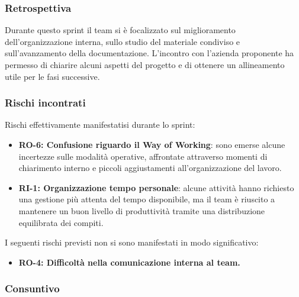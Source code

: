 \documentclass[a4paper,12pt]{article}
\newlength{\namecol}
\begin{document}
{        \subsubsection{Retrospettiva}{
            Durante questo sprint il team si è focalizzato sul miglioramento dell'organizzazione interna, sullo studio del materiale condiviso e sull'avanzamento della documentazione. L'incontro con l'azienda proponente ha permesso di chiarire alcuni aspetti del progetto e di ottenere un allineamento utile per le fasi successive.
        }

        \subsubsection{Rischi incontrati}{
            Rischi effettivamente manifestatisi durante lo sprint:
            \begin{itemize}
                \item \textbf{RO-6: Confusione riguardo il Way of Working}: sono emerse alcune incertezze sulle modalità operative, affrontate attraverso momenti di chiarimento interno e piccoli aggiustamenti all'organizzazione del lavoro.
                \item \textbf{RI-1: Organizzazione tempo personale}: alcune attività hanno richiesto una gestione più attenta del tempo disponibile, ma il team è riuscito a mantenere un buon livello di produttività tramite una distribuzione equilibrata dei compiti.
            \end{itemize}

            I seguenti rischi previsti non si sono manifestati in modo significativo:
            \begin{itemize}
                \item \textbf{RO-4: Difficoltà nella comunicazione interna al team.}
            \end{itemize}
        }

        \subsubsection{Consuntivo}{
            \begin{table}[H]
                \centering
                \hspace*{-14cm}%


\end{table}}}
\end{document}

